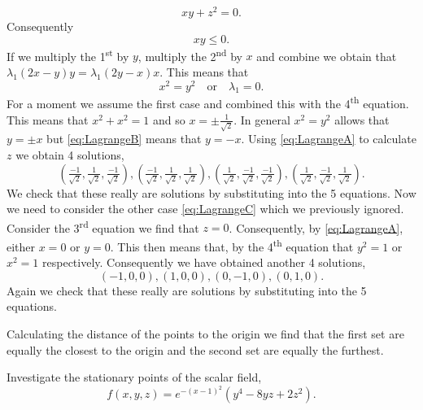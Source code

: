 \begin{solution}
\begin{equation}
        xy + z^2 = 0.
    \end{equation}
    Consequently
    \begin{equation}
        \label{eq:LagrangeB}
        xy \leq 0.
    \end{equation}
    If we multiply the 1\textsuperscript{st} by \(y\), multiply the 2\textsuperscript{nd} by \(x\) and combine we obtain that \(\lambda_1(2x-y)y = \lambda_1(2y - x)x\).
    This means that
    \begin{equation}
        \label{eq:LagrangeC}
        x^2 = y^2
        \quad \text{or} \quad
        \lambda_1 = 0.
    \end{equation}
    For a moment we assume the first case and combined this with the 4\textsuperscript{th} equation.
    This means that \(x^2 +x^2 = 1\) and so \(x = \pm \frac{1}{\sqrt{2}}\).
    In general \(x^2 = y^2\) allows that \(y = \pm x\) but \eqref{eq:LagrangeB} means that \(y = -x\). Using \eqref{eq:LagrangeA} to calculate \(z\) we obtain 4 solutions,
    \[
        (\tfrac{-1}{\sqrt{2}},\tfrac{1}{\sqrt{2}},\tfrac{-1}{\sqrt{2}}),
        (\tfrac{-1}{\sqrt{2}},\tfrac{1}{\sqrt{2}},\tfrac{1}{\sqrt{2}}),
        (\tfrac{1}{\sqrt{2}},\tfrac{-1}{\sqrt{2}},\tfrac{-1}{\sqrt{2}}),
        (\tfrac{1}{\sqrt{2}},\tfrac{-1}{\sqrt{2}},\tfrac{1}{\sqrt{2}}).
    \]
    We check that these really are solutions by substituting into the 5 equations.
    Now we need to consider the other case \eqref{eq:LagrangeC} which we previously ignored.
    Consider the 3\textsuperscript{rd} equation we find that \(z = 0\).
    Consequently, by \eqref{eq:LagrangeA}, either \(x=0\) or \(y=0\).
    This then means that, by the 4\textsuperscript{th} equation that \(y^2=1\) or \(x^2=1\) respectively.
    Consequently we have obtained another 4 solutions,
    \[
        (-1,0,0),
        (1,0,0),
        (0,-1,0),
        (0,1,0).
    \]
    Again we check that these really are solutions by substituting into the 5 equations.

    Calculating the distance of the points to the origin we find that the first set are equally the closest to the origin and the second set are equally the furthest.
\end{solution}



\begin{task}
    Investigate the stationary points of the scalar field,
    \[
        f(x,y,z) =  e^{-(x-1)^2}(y^4 - 8yz + 2z^2).
    \]
\end{task}

